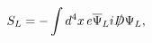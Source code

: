 \begin{equation}
S_L = -\int d^4x\, e{\overline\Psi}_L
i{D\kern-0.15em\raise0.17ex\llap{/}\kern0.15em\relax}\Psi_L,
\end{equation}

